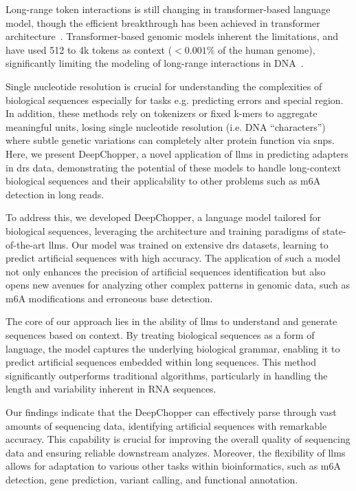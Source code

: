 \documentclass[pdflatex, sn-mathphys-num, lineno]{sn-jnl}%
\newcommand{\chopper}{DeepChopper\xspace}
\theoremstyle{thmstyleone}%
\theoremstyle{thmstyletwo}%
\theoremstyle{thmstylethree}%
\begin{document}
Long-range token interactions is still changing in transformer-based language model,
though the efficient breakthrough has been achieved in transformer architecture~\cite{tay2022efficient}.
Transformer-based genomic models  inherent the limitations, and have used 512 to 4k tokens as context (\(<0.001\%\) of the human genome), significantly limiting the modeling of long-range interactions in DNA~\cite{dalla2023nucleotide, zhou2023dnabert2, ji2021dnabert}.

Single nucleotide resolution is crucial for understanding the complexities of biological sequences especially for tasks e.g. predicting errors and special region.
In addition, these methods rely on tokenizers or fixed k-mers to aggregate meaningful units, losing single nucleotide resolution (i.e. DNA ``characters'') where subtle genetic variations can completely alter protein function via \glspl{snp}.
Here, we present \chopper, a novel application of \glspl{llm} in predicting adapters in \gls{drs} data, demonstrating the potential of these models to handle long-context biological sequences and their applicability to other problems such as m6A detection in long reads.

To address this, we developed \chopper, a language model tailored for biological sequences, leveraging the architecture and training paradigms of state-of-the-art \glspl{llm}.
Our model was trained on extensive \gls{drs} datasets, learning to predict artificial sequences with high accuracy.
The application of such a model not only enhances the precision of artificial sequences identification but also opens new avenues for analyzing other complex patterns in genomic data, such as m6A modifications and erroneous base detection.

The core of our approach lies in the ability of \glspl{llm} to understand and generate sequences based on context.
By treating biological sequences as a form of language, the model captures the underlying biological grammar, enabling it to predict  artificial sequences embedded within long sequences.
This method significantly outperforms traditional algorithms, particularly in handling the length and variability inherent in RNA sequences.

Our findings indicate that the \chopper can effectively parse through vast amounts of sequencing data, identifying  artificial sequences with remarkable accuracy.
This capability is crucial for improving the overall quality of sequencing data and ensuring reliable downstream analyzes.
Moreover, the flexibility of \glspl{llm} allows for adaptation to various other tasks within bioinformatics, such as m6A detection, gene prediction, variant calling, and functional annotation.
\end{document}
